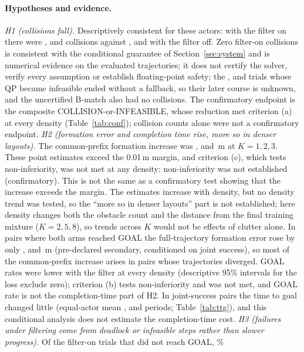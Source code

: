 \documentclass[journal]{IEEEtran}
\begin{document}
\paragraph{Hypotheses and evidence.}
\emph{H1 (collisions fall).} Descriptively consistent for these actors: with the filter on there were
\CollOnone, \CollOntwo{} and \CollOnthree{} collisions against \CollOffone, \CollOfftwo{} and
\CollOffthree{} with the filter off. Zero filter-on collisions is consistent with the conditional guarantee
of Section~\ref{sec:system} and is numerical evidence on the evaluated trajectories; it does not certify
the solver, verify every assumption or establish floating-point safety; the \InfOnone, \InfOntwo{} and \InfOnthree{} trials whose QP became
infeasible ended without a fallback, so their later course is unknown, and the uncertified B-match also
had no collisions. The confirmatory endpoint is the composite
COLLISION-or-INFEASIBLE, whose reduction met criterion (a) at every density (Table~\ref{tab:conf});
collision counts alone were not a confirmatory endpoint.
\emph{H2 (formation error and completion time rise, more so in denser layouts).} The common-prefix
formation increase was \Cincone, \Cinctwo{} and \Cincthree\,m at $K=1,2,3$. These point estimates
exceed the 0.01\,m margin, and criterion (c), which tests non-inferiority, was not met at any
density: non-inferiority was not established (confirmatory). This is not the same as a confirmatory
test showing that the increase exceeds the margin. The estimates increase with
density, but no density trend was tested, so the ``more so in denser layouts'' part is not
established; here density changes both the obstacle count and the distance from the final training
mixture ($K=2,5,8$), so trends across $K$ would not be effects of clutter alone. In pairs where both arms
reached GOAL the full-trajectory formation error rose by only \BothGoalFormone, \BothGoalFormtwo{} and
\BothGoalFormthree\,m (pre-declared secondary, conditioned on joint success), so most of the
common-prefix increase arises in pairs whose trajectories diverged. GOAL rates were lower with the
filter at every density (descriptive 95\% intervals for the loss exclude zero); criterion (b) tests
non-inferiority and was not met, and GOAL rate is not the completion-time part of H2. In joint-success
pairs the time to goal changed little (equal-actor mean \TtgEqOnone, \TtgEqOntwo{} and \TtgEqOnthree{} periods;
Table~\ref{tab:ttg}), and this conditional analysis does not estimate the completion-time cost.
\emph{H3 (failures under filtering come from deadlock or infeasible steps rather than slower
progress).} Of the \HthreeNongoalAll{} filter-on trials that did not reach GOAL, \HthreeShareAll\%
\end{document}
